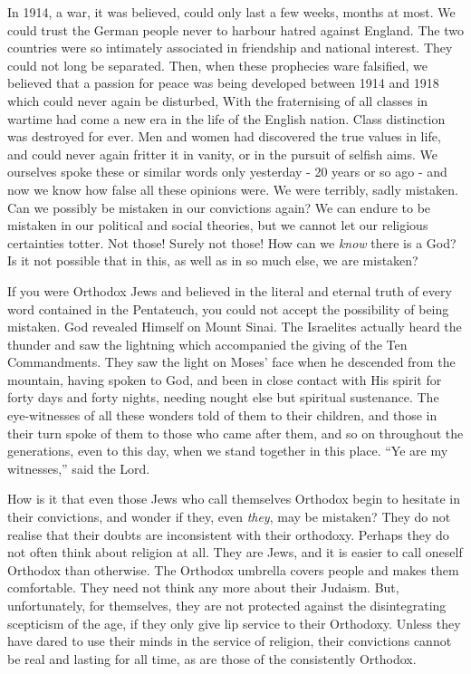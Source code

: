 In 1914, a war, it was believed, could only last a few
weeks, months at most. We could trust the German people
never to harbour hatred against England. The two countries
were so intimately associated in friendship and national
interest. They could not long be separated. Then, when
these prophecies ware falsified, we believed that a passion
for peace was being developed between 1914 and 1918 which
could never again be disturbed, With the fraternising of
all classes in wartime had come a new era in the life of
the English nation. Class distinction was destroyed for
ever. Men and women had discovered the true values in
life, and could never again fritter it in vanity, or in the
pursuit of selfish aims. We ourselves spoke these or
similar words only yesterday - 20 years or so ago - and now
we know how false all these opinions were. We were
terribly, sadly mistaken. Can we possibly be mistaken in
our convictions again? We can endure to be mistaken in our
political and social theories, but we cannot let our religious
certainties totter. Not those! Surely not those!
How can we \textsl{know} there is a God? Is it not possible that in
this, as well as in so much else, we are mistaken?

If you were Orthodox Jews and believed in the literal
and eternal truth of every word contained in the
Pentateuch, you could not accept the possibility of being
mistaken. God revealed Himself on Mount Sinai. The
Israelites actually heard the thunder and saw the lightning
which accompanied the giving of the Ten Commandments. They
saw the light on Moses’ face when he descended from the
mountain, having spoken to God, and been in close contact
with His spirit for forty days and forty nights, needing
nought else but spiritual sustenance. The eye-witnesses of
all these wonders told of them to their children, and those
in their turn spoke of them to those who came after them,
and so on throughout the generations, even to this day,
when we stand together in this place. ``Ye are my
witnesses,'' said the Lord.

How is it that even those Jews who call themselves
Orthodox begin to hesitate in their convictions, and wonder
if they, even \textsl{they}, may be mistaken? They do not realise
that their doubts are inconsistent with their orthodoxy.
Perhaps they do not often think about religion at all.
They are Jews, and it is easier to call oneself Orthodox
than otherwise. The Orthodox umbrella covers people and
makes them comfortable. They need not think any more about
their Judaism. But, unfortunately, for themselves, they
are not protected against the disintegrating scepticism of
the age, if they only give lip service to their Orthodoxy.
Unless they have dared to use their minds in the service of
religion, their convictions cannot be real and lasting for
all time, as are those of the consistently Orthodox.

